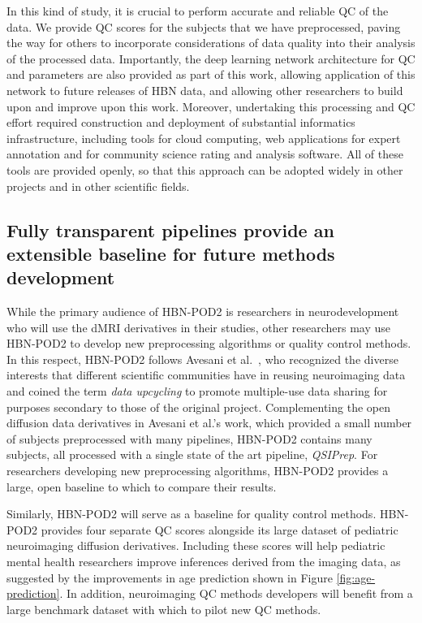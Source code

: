\documentclass[fleqn,10pt]{wlscirep}
\begin{document}
In this kind of study, it is crucial to perform accurate and reliable QC of the
data. We provide QC scores for the subjects that we have preprocessed, paving
the way for others to incorporate considerations of data quality into their
analysis of the processed data. Importantly, the deep learning network
architecture for QC and parameters are also provided as part of this work,
allowing application of this network to future releases of HBN data, and
allowing other researchers to build upon and improve upon this work. Moreover,
undertaking this processing and QC effort required construction and deployment
of substantial informatics infrastructure, including tools for cloud computing,
web applications for expert annotation and for community science rating and
analysis software. All of these tools are provided openly, so that this approach
can be adopted widely in other projects and in other scientific fields.

\subsection*{Fully transparent pipelines provide an extensible baseline for future methods development}

While the primary audience of HBN-POD2 is researchers in neurodevelopment who
will use the dMRI derivatives in their studies, other researchers may use
HBN-POD2 to develop new preprocessing algorithms or quality control methods. In
this respect, HBN-POD2 follows Avesani et al.~\cite{avesani2019-ey}, who
recognized the diverse interests that different scientific communities have in
reusing neuroimaging data and coined the term \emph{data upcycling} to promote
multiple-use data sharing for purposes secondary to those of the original
project. Complementing the open diffusion data derivatives in Avesani et al.'s
work, which provided a small number of subjects preprocessed with many
pipelines, HBN-POD2 contains many subjects, all processed with a single state of
the art pipeline, \emph{QSIPrep}. For researchers developing new preprocessing
algorithms, HBN-POD2 provides a large, open baseline to which to compare their
results.

Similarly, HBN-POD2 will serve as a baseline for quality control methods.
HBN-POD2 provides four separate QC scores alongside its large dataset of
pediatric neuroimaging diffusion derivatives. Including these scores will help
pediatric mental health researchers improve inferences derived from the imaging
data, as suggested by the improvements in age prediction shown in Figure
\ref{fig:age-prediction}. In addition, neuroimaging QC methods developers will
benefit from a large benchmark dataset with which to pilot new QC methods.
\end{document}
